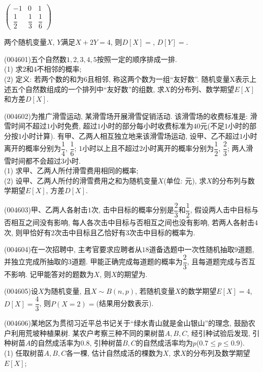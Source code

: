 \begin{center}
    $\begin{pmatrix}
        -1 & 0 & 1 \\
        \dfrac 12 & \dfrac 13 & \dfrac 16      
    \end{pmatrix}$
\end{center}
两个随机变量$X$, $Y$满足$X+2Y=4$, 则$D[X]=$, $D[Y]=$.
\item (004601)五个自然数$1, 2, 3, 4, 5$按照一定的顺序排成一排.\\
(1) 求$2$和$4$不相邻的概率;\\
(2) 定义: 若两个数的和为$6$且相邻, 称这两个数为一组``友好数''. 随机变量X表示上述五个自然数组成的一个排列中``友好数''的组数, 求$X$的分布列、数学期望$E[X]$和方差$D[X]$.
\item (004602)为推广滑雪运动, 某滑雪场开展滑雪促销活动. 该滑雪场的收费标准是: 滑雪时间不超过$1$小时免费, 超过$1$小时的部分每小时收费标准为$40$元(不足$1$小时的部分按$1$小时计算). 有甲、乙两人相互独立地来该滑雪场运动, 设甲、乙不超过$1$小时离开的概率分别为$\dfrac 14$, $\dfrac 16$; $1$小时以上且不超过$2$小时离开的概率分别为$\dfrac 12$, $\dfrac 23$; 两人滑雪时间都不会超过$3$小时.\\
(1) 求甲、乙两人所付滑雪费用相同的概率;\\
(2) 设甲、乙两人所付的滑雪费用之和为随机变量$X$(单位: 元), 求$X$的分布列与数学期望$E[X]$, 方差$D[X]$.
\item (004603)甲、乙两人各射击$1$次, 击中目标的概率分别是$\dfrac 23$和$\dfrac 12$, 假设两人击中目标与否相互之间没有影响, 每人各次击中目标与否相互之间也没有影响, 若两人各射击$4$次, 则甲恰好有$2$次击中目标且乙恰好有$3$次击中目标的概率为.
\item (004604)在一次招聘中, 主考官要求应聘者从$18$道备选题中一次性随机抽取$9$道题, 并独立完成所抽取的$3$道题. 甲能正确完成每道题的概率为$\dfrac 23$, 且每道题完成与否互不影响. 记甲能答对的题数为$X$, 则$X$的期望为.
\item (004605)设$X$为随机变量, 且$X\sim B(n,p)$, 若随机变量$X$的数学期望$E[X]=4$, $D[X]=\dfrac 43$, 则$P(X=2)=$(结果用分数表示).
\item (004606)某地区为贯彻习近平总书记关于``绿水青山就是金山银山''的理念, 鼓励农户利用荒坡种植果树. 某农户考察三种不同的果树苗$A,B,C$, 经引种试验后发现, 引种树苗$A$的自然成活率为$0.8$, 引种树苗$B,C$的自然成活率均为$p$($0.7\le p\le 0.9$).\\
(1) 任取树苗$A,B,C$各一棵, 估计自然成活的棵数为$X$, 求$X$的分布列及数学期望$E[X]$;\\

